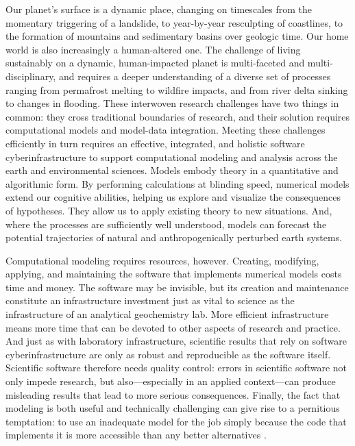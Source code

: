 \documentclass[12pt]{amsart}
\begin{document}
Our planet's surface is a dynamic place, changing on timescales from the momentary triggering of a landslide, to year-by-year resculpting of coastlines, to the formation of mountains and sedimentary basins over geologic time. Our home world is also increasingly a human-altered one.  The challenge of living sustainably on a dynamic, human-impacted planet is multi-faceted and multi-disciplinary, and requires a deeper understanding of a diverse set of processes ranging from permafrost melting to wildfire impacts, and from river delta sinking to changes in flooding. These interwoven research challenges have two things in common: they cross traditional boundaries of research, and their solution requires computational models and model-data integration. Meeting these challenges efficiently in turn requires an effective, integrated, and holistic software cyberinfrastructure to support computational modeling and analysis across the earth and environmental sciences. Models embody theory in a quantitative and algorithmic form. By performing calculations at blinding speed, numerical models extend our cognitive abilities, helping us explore and visualize the consequences of hypotheses. They allow us to apply existing theory to new situations. And, where the processes are sufficiently well understood, models can forecast the potential trajectories of natural and anthropogenically perturbed earth systems.

Computational modeling requires resources, however. Creating, modifying, applying, and maintaining the software that implements numerical models costs time and money. The software may be invisible, but its creation and maintenance constitute an infrastructure investment just as vital to science as the infrastructure of an analytical geochemistry lab. More efficient infrastructure means more time that can be devoted to other aspects of research and practice. And just as with laboratory infrastructure, scientific results that rely on software cyberinfrastructure are only as robust and reproducible as the software itself. Scientific software therefore needs quality control: errors in scientific software not only impede research, but also---especially in an applied context---can produce misleading results that lead to more serious consequences. Finally, the fact that modeling is both useful and technically challenging can give rise to a pernitious temptation: to use an inadequate model for the job simply because the code that implements it is more accessible than any better alternatives \citep{addor2019legacy}. 
\end{document}
